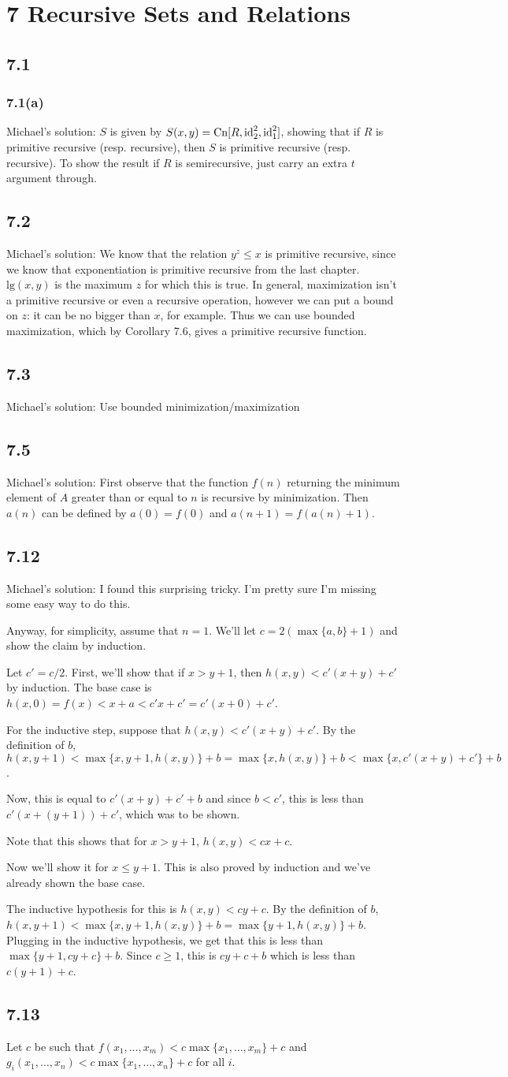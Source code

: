 \documentclass{article}
\newcommand\s{\section*}
\renewcommand\ss{\subsection*}
\newcommand\sss{\subsubsection*}
\newcommand\ms{Michael's solution: } %
\begin{document}
\s{7 Recursive Sets and Relations}
\ss{7.1}
\sss{7.1(a)}
\ms $S$ is given by $S(x,y)=\mathrm{Cn}[R,\mathrm{id}^2_2,\mathrm{id}^2_1]$, showing that if $R$ is primitive recursive (resp. recursive), then $S$ is primitive recursive (resp. recursive).  To show the result if $R$ is semirecursive, just carry an extra $t$ argument through.
\ss{7.2}
\ms We know that the relation $y^z\leq x$ is primitive recursive, since we know that exponentiation is primitive recursive from the 
last chapter.  $\mathrm{lg}(x, y)$ is the maximum $z$ for which
this is true.  In general, maximization isn't a primitive recursive or even a recursive operation, however we can put a bound on $z$: it can be no bigger than $x$, for example.  Thus we can use bounded maximization, which by Corollary 7.6, gives a primitive recursive function.
\ss{7.3}
\ms Use bounded minimization/maximization
\ss{7.5}
\ms First observe that the function $f(n)$ returning the minimum element of $A$ greater than or equal to $n$ is recursive by minimization.  Then $a(n)$ can be defined by $a(0) = f(0)$ and $a(n + 1) = f(a(n) + 1)$.
\ss{7.12}
\ms I found this surprising tricky.  I'm pretty sure I'm missing some easy way to do this.

Anyway, for simplicity, assume that $n=1$.  We'll let $c = 2(\max\{a,b\} + 1)$ and show the claim by
induction.

Let $c' = c/2$.  First, we'll show that if $x>y+1$, then $h(x,y) < c' (x + y) + c'$ by induction.  The base case
is $h(x,0) = f(x) < x + a < c' x + c' = c' (x + 0) + c'$.

For the inductive step, suppose that $h(x,y) < c' (x + y) + c'$.  By the definition of $b$,
$h(x,y+1) < \max\{x,y+1,h(x,y)\} + b = \max\{x,h(x,y)\} + b < \max\{x,c'(x + y) + c'\} + b$.

Now, this is equal to $c'(x+y) + c' + b$ and since $b < c'$, this is less than $c'(x + (y + 1)) + c'$,
which was to be shown.

Note that this shows that for $x > y + 1$, $h(x,y) < c x + c$.

Now we'll show it for $x \leq y + 1$.  This is also proved by induction and we've already shown
the base case.

The inductive hypothesis for this is $h(x,y) < cy + c$.  By the definition of $b$, $h(x,y+1) < \max\{x,y+1,h(x,y)\} + b = \max\{y+1,h(x,y)\} + b$.  Plugging in the inductive hypothesis, we get that this is less than $\max\{y+1,cy+c\} + b$.  Since $c\geq 1$, this is $cy + c + b$ which is less than $c(y+1) + c$.
\ss{7.13}
Let $c$ be such that $f(x_1,\ldots,x_m) < c \max\{x_1,\ldots,x_m\} + c$ and $g_i(x_1,\ldots,x_n) < c \max\{x_1,\ldots,x_n\} + c$ for all $i$.
\end{document}
